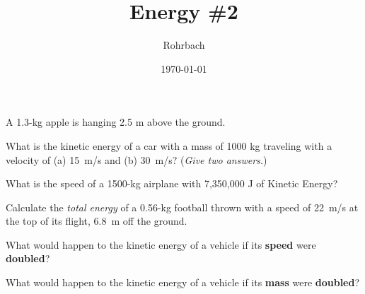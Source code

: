 \documentclass[10pt]{exam}
\title{Energy \#2}
\author{Rohrbach}
\date{\today}
\begin{document}
\maketitle

\begin{questions}

\question
  A 1.3-kg apple is hanging 2.5 m above the ground.


\question
  What is the kinetic energy of a car with a mass of 1000 kg traveling with a velocity of (a) 15~m/s and (b) 30~m/s? (\emph{Give two answers.})
  \vs

\question
  What is the speed of a 1500-kg airplane with 7,350,000 J of Kinetic Energy?
  \vs

\question
  Calculate the \emph{total energy} of a 0.56-kg football thrown with a speed of 22~m/s at the top of its flight, 6.8~m off the ground.
  \vs

\pagebreak


\question 
  What would happen to the kinetic energy of a vehicle if its {\bf speed} were {\bf doubled}?
  \vs 

\question 
  What would happen to the kinetic energy of a vehicle if its {\bf mass} were {\bf doubled}?
  \vs 


\end{questions}
\end{document}
